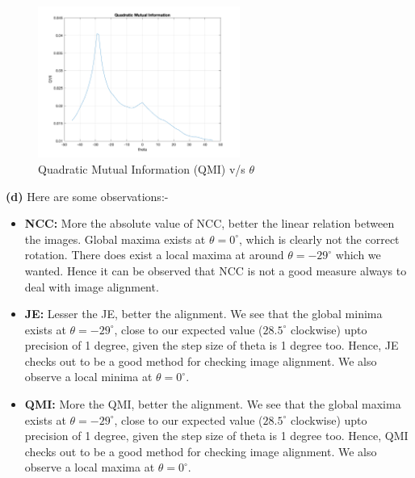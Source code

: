 \documentclass[12pt]{article}
\begin{document}
\vspace{-25pt}

\begin{figure}[H]
    \centering
    \includegraphics[width=0.59\textwidth]{QMI.png}
    \vspace{-10pt}
    \caption{Quadratic Mutual Information (QMI) v/s $\theta$}
\end{figure}

\textbf{(d)} Here are some observations:-

\vspace{-10pt}

\begin{itemize}[itemsep=0em]
    \item \textbf{NCC:} More the absolute value of NCC, better the linear relation between the images. Global maxima exists at $\theta = 0^{\circ}$, which is clearly not the correct rotation. There does exist a local maxima at around $\theta = -29^{\circ}$ which we wanted. Hence it can be observed that NCC is not a good measure always to deal with image alignment.
    \item \textbf{JE:} Lesser the JE, better the alignment. We see that the global minima exists at $\theta = -29^{\circ}$, close to our expected value ($28.5^{\circ}$ clockwise) upto precision of 1 degree, given the step size of theta is 1 degree too. Hence, JE checks out to be a good method for checking image alignment. We also observe a local minima at $\theta = 0^{\circ}$.
    \item \textbf{QMI:} More the QMI, better the alignment. We see that the global maxima exists at $\theta = -29^{\circ}$, close to our expected value ($28.5^{\circ}$ clockwise) upto precision of 1 degree, given the step size of theta is 1 degree too. Hence, QMI checks out to be a good method for checking image alignment. We also observe a local maxima at $\theta = 0^{\circ}$.
\end{itemize}
\end{document}
